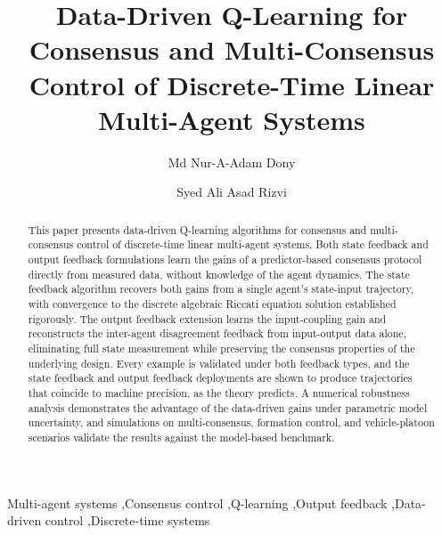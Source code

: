 \documentclass[12pt]{elsarticle}
\theoremstyle{remark}
\begin{document}
\begin{frontmatter}
\title{Data-Driven Q-Learning for Consensus and Multi-Consensus Control of Discrete-Time Linear Multi-Agent Systems}
\author[ttu]{Md Nur-A-Adam Dony}
\author[ttu]{Syed Ali Asad Rizvi}
\begin{abstract}
This paper presents data-driven Q-learning algorithms for consensus and multi-consensus control of discrete-time linear multi-agent systems. Both state feedback and output feedback formulations learn the gains of a predictor-based consensus protocol directly from measured data, without knowledge of the agent dynamics. The state feedback algorithm recovers both gains from a single agent's state-input trajectory, with convergence to the discrete algebraic Riccati equation solution established rigorously. The output feedback extension learns the input-coupling gain and reconstructs the inter-agent disagreement feedback from input-output data alone, eliminating full state measurement while preserving the consensus properties of the underlying design. Every example is validated under both feedback types, and the state feedback and output feedback deployments are shown to produce trajectories that coincide to machine precision, as the theory predicts. A numerical robustness analysis demonstrates the advantage of the data-driven gains under parametric model uncertainty, and simulations on multi-consensus, formation control, and vehicle-platoon scenarios validate the results against the model-based benchmark.
\end{abstract}
\begin{keyword}
Multi-agent systems \sep Consensus control \sep Q-learning \sep Output feedback \sep Data-driven control \sep Discrete-time systems
\end{keyword}
\end{frontmatter}
\end{document}
